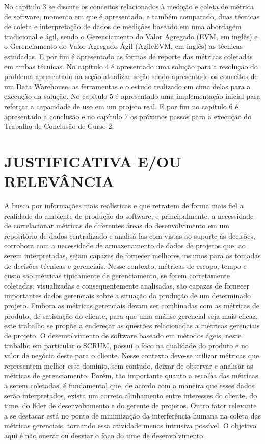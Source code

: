 No capítulo 3 se discute os conceitos relacionados à medição e coleta de métrica de software, momento em que é apresentado, e também comparado, duas técnicas de coleta e interpretação de dados de medições baseado em uma abordagem tradicional e ágil, sendo o Gerenciamento do Valor Agregado (EVM, em inglês) e o Gerenciamento do Valor Agregado Ágil (AgileEVM, em inglês) as técnicas estudadas. E por fim é apresentado as formas de reporte das métricas coletadas em ambas técnicas.
No capítulo 4 é apresentado uma solução para a resolução do problema apresentado na seção {\color{red} atualizar seção} sendo apresentado os conceitos de um Data Warehouse, as ferramentas e o estudo realizado em cima delas para a execução da solução.
No capítulo 5 é apresentado uma implementação inicial para reforçar a capacidade de uso em um projeto real.
E por fim no capítulo 6 é apresentado a conclusão e no capítulo 7 os próximos passos para a execução do Trabalho de Conclusão de Curso 2.

\section{JUSTIFICATIVA E/OU RELEVÂNCIA}
A busca por informações mais realísticas e que retratem de forma mais fiel a realidade do ambiente de produção do software, e principalmente, a necessidade de correlacionar métricas de diferentes áreas do desenvolvimento em um repositório de dados centralizado e analisá-las com vistas ao suporte às decisões, corrobora com a necessidade de armazenamento de dados de projetos que, ao serem interpretadas, sejam capazes de fornecer melhores insumos para as tomadas de decisões técnicas e gerenciais.
Nesse contexto, métricas de escopo, tempo e custo são métricas tipicamente de gerenciamento, se forem corretamente coletadas, visualizadas e consequentemente analisadas, são capazes de fornecer importantes dados gerenciais sobre a situação da produção de um determinado projeto. Embora as métricas gerenciais devam ser combinadas com as métricas de produto, de satisfação do cliente, para que uma análise gerencial seja mais eficaz, este trabalho se propõe a endereçar as questões relacionadas a métricas gerenciais de projeto.
O desenvolvimento de software baseado em métodos ágeis, neste trabalho em particular o SCRUM, possui o foco na qualidade do produto e no valor de negócio deste para o cliente. Nesse contexto deve-se utilizar métricas que representem melhor esse domínio, sem contudo, deixar de observar e analisar as métricas de gerenciamento.
Porém, tão importante quanto a escolha das métricas a serem coletadas, é fundamental que, de acordo com a maneira que esses dados serão interpretados, exista um correto alinhamento entre interesses do cliente, do time, do líder de desenvolvimento e do gerente de projetos.
Outro fator relevante a se destacar está no ponto de minimização da interferência humana na coleta das métricas gerenciais, tornando essa atividade menos intrusiva possível. O objetivo aqui é não onerar ou desviar o foco do time de desenvolvimento.

